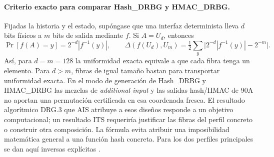 \paragraph{Criterio exacto para comparar Hash\_DRBG y HMAC\_DRBG.}
Fijadas la historia y el estado, supóngase que una interfaz determinista
lleva \(d\) bits físicos a \(m\) bits de salida mediante \(f\).
Si \(A=U_d\), entonces
\[
  \Pr[f(A)=y]=2^{-d}|f^{-1}(y)|,\qquad
  \Delta(f(U_d),U_m)=\tfrac12\sum_y\big|2^{-d}|f^{-1}(y)|-2^{-m}\big|.
\]
Así, para \(d=m=128\) la uniformidad exacta equivale a que cada fibra tenga
un elemento. Para \(d>m\), fibras de igual tamaño bastan para transportar
uniformidad exacta. En el modo de generación de Hash\_DRBG y HMAC\_DRBG
las mezclas de \emph{additional input} y las salidas hash/HMAC de 90A no
aportan una permutación certificada en esa coordenada fresca. El resultado
algorítmico DRG.3 que AIS atribuye a esos diseños responde a un objetivo
computacional; un resultado ITS requeriría justificar las fibras del perfil
concreto o construir otra composición. La fórmula evita atribuir una
imposibilidad matemática general a una función hash concreta. Para los dos
perfiles principales se dan aquí inversas explícitas
\cite[§§998,1003--1007]{ais}\cite[§§10.1.1--10.1.2]{nist90a}.
